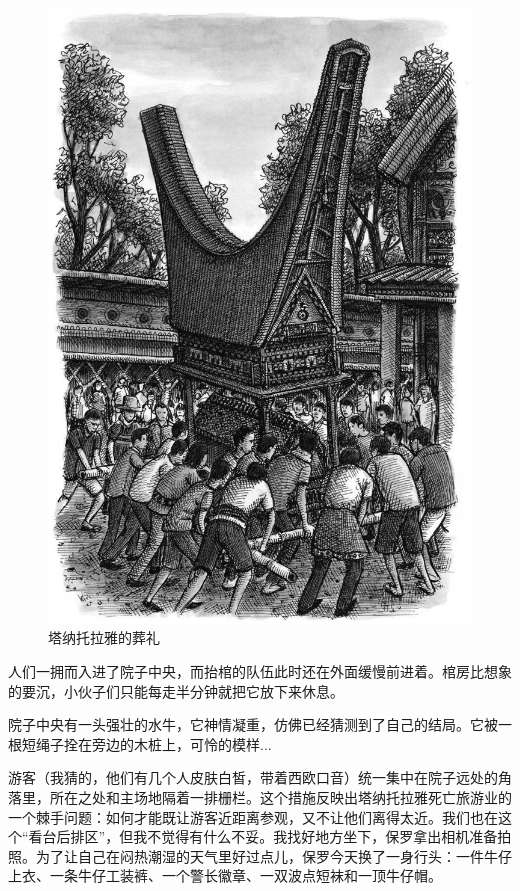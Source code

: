 \documentclass[12pt,oneside]{book}
\begin{document}
\begin{bookref}[frametitle={\cite{好好告别：世界葬礼观察手记}}]
\begin{figure}[H]
\centering
\includegraphics[width=\linewidth ,totalheight=0.95\textheight , keepaspectratio]{塔纳托拉雅的葬礼.jpg}
\caption{塔纳托拉雅的葬礼}
\label{fig:ta_na_tuo_la_ya_de_zang_li}
\end{figure}

人们一拥而入进了院子中央，而抬棺的队伍此时还在外面缓慢前进着。棺房比想象的要沉，小伙子们只能每走半分钟就把它放下来休息。

院子中央有一头强壮的水牛，它神情凝重，仿佛已经猜测到了自己的结局。它被一根短绳子拴在旁边的木桩上，可怜的模样...

游客（我猜的，他们有几个人皮肤白皙，带着西欧口音）统一集中在院子远处的角落里，所在之处和主场地隔着一排栅栏。这个措施反映出塔纳托拉雅死亡旅游业的一个棘手问题：如何才能既让游客近距离参观，又不让他们离得太近。我们也在这个“看台后排区”，但我不觉得有什么不妥。我找好地方坐下，保罗拿出相机准备拍照。为了让自己在闷热潮湿的天气里好过点儿，保罗今天换了一身行头：一件牛仔上衣、一条牛仔工装裤、一个警长徽章、一双波点短袜和一顶牛仔帽。


\end{bookref}
\end{document}
